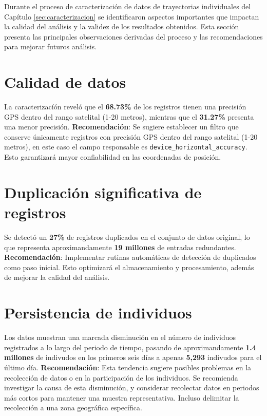 Durante el proceso de caracterización de datos de trayectorias individuales del Capítulo \ref{sec:caracterizacion} se identificaron aspectos importantes que impactan la calidad del análisis y la validez de los resultados obtenidos. Esta sección presenta las principales observaciones derivadas del proceso y las recomendaciones para mejorar futuros análisis.

\section{Calidad de datos}
La caracterizacíón reveló que el \textbf{68.73\%} de los registros tienen una precisión GPS dentro del rango satelital (1-20 metros), mientras que el \textbf{31.27\%} presenta una menor precisión. 
\textbf{Recomendación}: Se sugiere establecer un filtro que conserve únicamente registros con precisión GPS dentro del rango satelital (1-20 metros), en este caso el campo responsable es \texttt{device\_horizontal\_accuracy}. Esto garantizará mayor confiabilidad en las coordenadas de posición.

\section{Duplicación significativa de registros}
Se detectó un \textbf{27\%} de registros duplicados en el conjunto de datos original, lo que representa aproximandamente \textbf{19 millones} de entradas redundantes.
\textbf{Recomendación}: Implementar rutinas automáticas de detección de duplicados como paso inicial. Esto optimizará el almacenamiento y procesamiento, además de mejorar la calidad del análisis.

\section{Persistencia de individuos}
Los datos muestran una marcada disminución en el número de individuos registrados a lo largo del periodo de tiempo, pasando de aproximandamente \textbf{1.4 millones} de indivudos en los primeros seis días a apenas \textbf{5,293} indivudos para el último día.
\textbf{Recomendación}: Esta tendencia sugiere posibles problemas en la recolección de datos o en la participación de los individuos. Se recomienda investigar la causa de esta disminución, y considerar recolectar datos en periodos más cortos para mantener una muestra representativa. Incluso delimitar la recolección a una zona geográfica específica.


